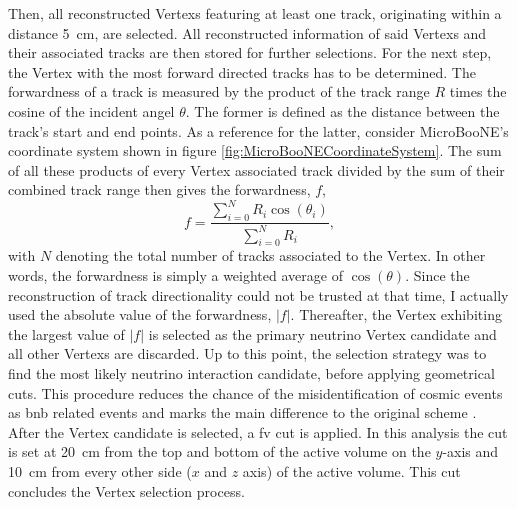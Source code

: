 Then, all reconstructed \glspl{Vertex} featuring at least one track, originating within a distance \SI{5}{\centi\metre}, are selected. All reconstructed information of said \glspl{Vertex} and their associated tracks are then stored for further selections. For the next step, the \gls{Vertex} with the most forward directed tracks has to be determined. The forwardness of a track is measured by the product of the track range $R$ times the cosine of the incident angel $\theta$. The former is defined as the distance between the track's start and end points. As a reference for the latter, consider MicroBooNE's coordinate system shown in figure \ref{fig:MicroBooNECoordinateSystem}. The sum of all these products of every \gls{Vertex} associated track divided by the sum of their combined track range then gives the forwardness, $f$, \ie
\begin{equation} \label{eq:Forwardness}
    f = \frac{\sum_{i=0}^{N} R_i \cos\left( \theta_i \right)}{\sum_{i=0}^{N} R_i},
\end{equation}
with $N$ denoting the total number of tracks associated to the \gls{Vertex}. In other words, the forwardness is simply a weighted average of $\cos{(\theta)}$. Since the reconstruction of track directionality could not be trusted at that time, I actually used the absolute value of the forwardness, $|f|$. Thereafter, the \gls{Vertex} exhibiting the largest value of $|f|$ is selected as the primary neutrino \gls{Vertex} candidate and all other \glspl{Vertex} are discarded. Up to this point, the selection strategy was to find the most likely neutrino interaction candidate, before applying geometrical cuts. This procedure reduces the chance of the misidentification of cosmic events as \gls{bnb} related events and marks the main difference to the original scheme \cite{MCPerfPublicNote}. After the \gls{Vertex} candidate is selected, a \gls{fv} cut is applied. In this analysis the cut is set at \SI{20}{\centi\metre} from the top and bottom of the active volume on the $y$-axis and \SI{10}{\centi\metre} from every other side ($x$ and $z$ axis) of the active volume. This cut concludes the \gls{Vertex} selection process. 

